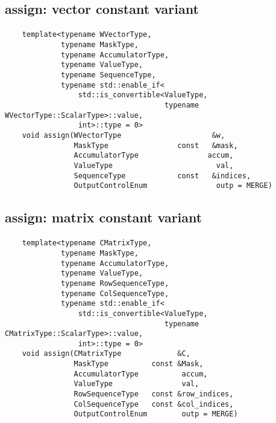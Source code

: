 \subsection{{\sf assign}: vector constant variant}

\paragraph{\syntax}

\begin{verbatim}
    template<typename WVectorType,
             typename MaskType,
             typename AccumulatorType,
             typename ValueType,
             typename SequenceType,
             typename std::enable_if<
                 std::is_convertible<ValueType,
                                     typename WVectorType::ScalarType>::value,
                 int>::type = 0>
    void assign(WVectorType                     &w,
                MaskType                const   &mask,
                AccumulatorType                accum,
                ValueType                        val,
                SequenceType            const   &indices,
                OutputControlEnum                outp = MERGE)
\end{verbatim}


\subsection{{\sf assign}: matrix constant variant}

\paragraph{\syntax}

\begin{verbatim}
    template<typename CMatrixType,
             typename MaskType,
             typename AccumulatorType,
             typename ValueType,
             typename RowSequenceType,
             typename ColSequenceType,
             typename std::enable_if<
                 std::is_convertible<ValueType,
                                     typename CMatrixType::ScalarType>::value,
                 int>::type = 0>
    void assign(CMatrixType             &C,
                MaskType          const &Mask,
                AccumulatorType          accum,
                ValueType                val,
                RowSequenceType   const &row_indices,
                ColSequenceType   const &col_indices,
                OutputControlEnum        outp = MERGE)
\end{verbatim}



